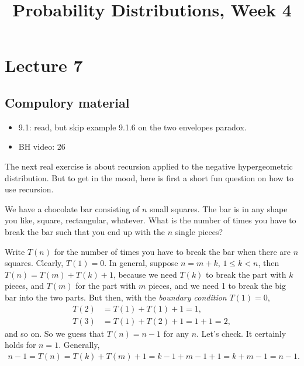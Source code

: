 


\title{Probability Distributions, Week 4}


\maketitle
\toccontents

\section{Lecture 7}
\label{sec:lecture-1}


\subsection{Compulory material}
\label{sec:compulory-material}

\begin{itemize}
\item 9.1: read, but skip example 9.1.6 on the two envelopes paradox.
\item BH video: 26
\end{itemize}




The next real exercise is about recursion applied to the negative hypergeometric distribution.
But to get in the mood, here is first a short fun question on how to use recursion.

\begin{exercise}
We have a chocolate bar consisting of $n$ small squares.
The bar is in any shape you like, square, rectangular, whatever.
What is the number of times you have to break the bar such that you end up with the $n$ single pieces?
\begin{solution}
  Write $T(n)$ for the number of times you have to break the bar when there are $n$ squares.
  Clearly, $T(1) =0$.
  In general, suppose $n=m+k$, $1 \leq k < n$, then $T(n) = T(m) + T(k) + 1$, because we need $T(k)$ to break the part with $k$ pieces, and $T(m)$ for the part with $m$ pieces, and we need 1 to break the big bar into the two parts. But then, with the \emph{boundary condition} $T(1)=0$,
  \begin{align*}
    T(2) &= T(1) + T(1) + 1 = 1, \\
T(3) &= T(1) + T(2) + 1 = 1 + 1 = 2,
  \end{align*}
and so on. So we guess that $T(n)=n-1$ for any $n$. Let's check. It certainly holds for $n=1$.  Generally,
\begin{align*}
n-1 = T(n) = T(k) + T(m) + 1 = k-1 + m-1 + 1 = k+m-1 = n-1.
\end{align*}
\end{solution}
\end{exercise}


